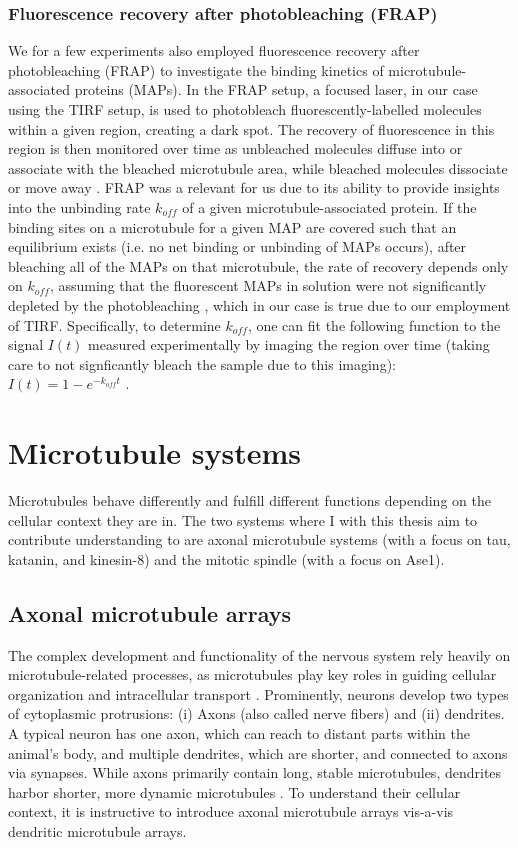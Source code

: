 \subsubsection{Fluorescence recovery after photobleaching (FRAP)}
\label{sec:FRAP}
We for a few experiments also employed fluorescence recovery after photobleaching (FRAP) to investigate the binding kinetics of microtubule-associated proteins (MAPs). In the FRAP setup, a focused laser, in our case using the TIRF setup, is used to photobleach fluorescently-labelled molecules within a given region, creating a dark spot. The recovery of fluorescence in this region is then monitored over time as unbleached molecules diffuse into or associate with the bleached microtubule area, while bleached molecules dissociate or move away \parencite{axelrod1976mobility}. FRAP was a relevant for us due to its ability to provide insights into the unbinding rate $k_{off}$ of a given microtubule-associated protein. If the binding sites on a microtubule for a given MAP are covered such that an equilibrium exists (i.e. no net binding or unbinding of MAPs occurs), after bleaching all of the MAPs on that microtubule, the rate of recovery depends only on $k_{off}$, assuming that the fluorescent MAPs in solution were not significantly depleted by the photobleaching \parencite{bulinski2001rapid}, which in our case is true due to our employment of TIRF. Specifically, to determine $k_{off}$, one can fit the following function to the signal $I(t)$ measured experimentally by imaging the region over time (taking care to not signficantly bleach the sample due to this imaging): $I(t)=1-e^{-k_{off}t}$ \parencite{bulinski2001rapid}.

\section{Microtubule systems}
Microtubules behave differently and fulfill different functions depending on the cellular context they are in. The two systems where I with this thesis aim to contribute understanding to are axonal microtubule systems (with a focus on tau, katanin, and kinesin-8) and the mitotic spindle (with a focus on Ase1).

\subsection{Axonal microtubule arrays}
\label{sec:neuron}
The complex development and functionality of the nervous system rely heavily on microtubule-related processes, as microtubules play key roles in guiding cellular organization and intracellular transport \parencite{Kapitein2015}. Prominently, neurons develop two types of cytoplasmic protrusions: (i) Axons (also called nerve fibers) and (ii) dendrites. A typical neuron has one axon, which can reach to distant parts within the animal's body, and multiple dendrites, which are shorter, and connected to axons via synapses. While axons primarily contain long, stable microtubules, dendrites harbor shorter, more dynamic microtubules \parencite{Tas2017}. To understand their cellular context, it is instructive to introduce axonal microtubule arrays vis-a-vis dendritic microtubule arrays.\par

